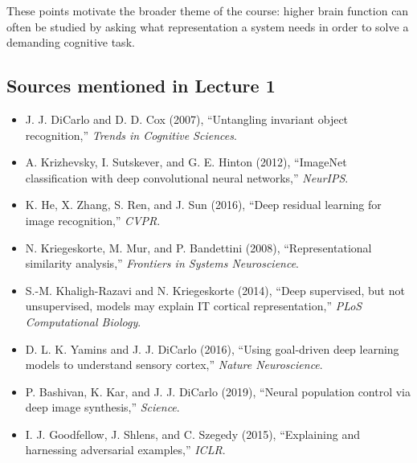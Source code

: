 These points motivate the broader theme of the course: higher brain function can often be studied by asking what representation a system needs in order to solve a demanding cognitive task.

\subsection*{Sources mentioned in Lecture 1}

\begin{itemize}
    \item J. J. DiCarlo and D. D. Cox (2007), ``Untangling invariant object recognition,'' \emph{Trends in Cognitive Sciences}.
    \item A. Krizhevsky, I. Sutskever, and G. E. Hinton (2012), ``ImageNet classification with deep convolutional neural networks,'' \emph{NeurIPS}.
    \item K. He, X. Zhang, S. Ren, and J. Sun (2016), ``Deep residual learning for image recognition,'' \emph{CVPR}.
    \item N. Kriegeskorte, M. Mur, and P. Bandettini (2008), ``Representational similarity analysis,'' \emph{Frontiers in Systems Neuroscience}.
    \item S.-M. Khaligh-Razavi and N. Kriegeskorte (2014), ``Deep supervised, but not unsupervised, models may explain IT cortical representation,'' \emph{PLoS Computational Biology}.
    \item D. L. K. Yamins and J. J. DiCarlo (2016), ``Using goal-driven deep learning models to understand sensory cortex,'' \emph{Nature Neuroscience}.
    \item P. Bashivan, K. Kar, and J. J. DiCarlo (2019), ``Neural population control via deep image synthesis,'' \emph{Science}.
    \item I. J. Goodfellow, J. Shlens, and C. Szegedy (2015), ``Explaining and harnessing adversarial examples,'' \emph{ICLR}.
\end{itemize}

